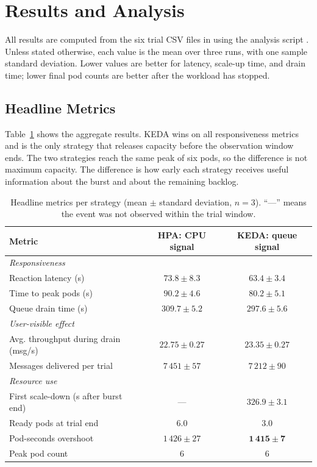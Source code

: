 \section{Results and Analysis}
\label{sec:results}

All results are computed from the six trial CSV files in  using the analysis script . Unless stated otherwise, each value is the mean over three runs, with one sample standard deviation. Lower values are better for latency, scale-up time, and drain time; lower final pod counts are better after the workload has stopped.

\subsection{Headline Metrics}
\label{subsec:res-summary}
Table~\ref{tab:summary} shows the aggregate results. KEDA wins on all responsiveness metrics and is the only strategy that releases capacity before the observation window ends. The two strategies reach the same peak of six pods, so the difference is not maximum capacity. The difference is how early each strategy receives useful information about the burst and about the remaining backlog.

\begin{table}[t]
  \centering
  \small
  \caption{Headline metrics per strategy (mean $\pm$ standard deviation, $n=3$). ``---'' means the event was not observed within the trial window.}
  \label{tab:summary}
  \begin{tabular}{lcc}
    \toprule
    \textbf{Metric} & \textbf{HPA: CPU signal} & \textbf{KEDA: queue signal} \\
    \midrule
    \multicolumn{3}{l}{\emph{Responsiveness}} \\
    Reaction latency (s)                  & $73.8 \pm 8.3$   & $\mathbf{63.4 \pm 3.4}$ \\
    Time to peak pods (s)                 & $90.2 \pm 4.6$   & $\mathbf{80.2 \pm 5.1}$ \\
    Queue drain time (s)                  & $309.7 \pm 5.2$  & $\mathbf{297.6 \pm 5.6}$ \\
    \midrule
    \multicolumn{3}{l}{\emph{User-visible effect}} \\
    Avg. throughput during drain (msg/s)  & $22.75 \pm 0.27$ & $\mathbf{23.35 \pm 0.27}$ \\
    Messages delivered per trial          & $7\,451 \pm 57$  & $7\,212 \pm 90$ \\
    \midrule
    \multicolumn{3}{l}{\emph{Resource use}} \\
    First scale-down (s after burst end)  & ---              & $\mathbf{326.9 \pm 3.1}$ \\
    Ready pods at trial end               & $6.0$            & $\mathbf{3.0}$ \\
    Pod-seconds overshoot                 & $1\,426 \pm 27$  & $\mathbf{1\,415 \pm 7}$ \\
    Peak pod count                        & $6$              & $6$ \\
    \bottomrule
  \end{tabular}
\end{table}

